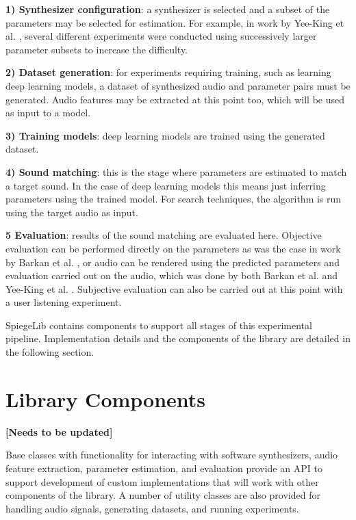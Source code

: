 \textbf{1) Synthesizer configuration}: a synthesizer is selected and a subset of the parameters may be selected for estimation. For example, in work by Yee-King et al. \cite{yee2018automatic}, several different experiments were conducted using successively larger parameter subsets to increase the difficulty.

\textbf{2) Dataset generation}: for experiments requiring training, such as learning deep learning models, a dataset of synthesized audio and parameter pairs must be generated. Audio features may be extracted at this point too, which will be used as input to a model.

\textbf{3) Training models}: deep learning models are trained using the generated dataset.

\textbf{4) Sound matching}: this is the stage where parameters are estimated to match a target sound. In the case of deep learning models this means just inferring parameters using the trained model. For search techniques, the algorithm is run using the target audio as input.

\textbf{5 Evaluation}: results of the sound matching are evaluated here. Objective evaluation can be performed directly on the parameters as was the case in work by Barkan et al. \cite{barkan2019inversynth},  or audio can be rendered using the predicted parameters and evaluation carried out on the audio, which was done by both Barkan et al. and Yee-King et al. \cite{yee2018automatic}. Subjective evaluation can also be carried out at this point with a user listening experiment.

SpiegeLib contains components to support all stages of this experimental pipeline. Implementation details and the components of the library are detailed in the following section.


\section{Library Components}
\textbf{[Needs to be updated]}

Base classes with functionality for interacting with software synthesizers, audio feature extraction, parameter estimation, and evaluation provide an API to support development of custom implementations that will work with other components of the library. A number of utility classes are also provided for handling audio signals, generating datasets, and running experiments.

